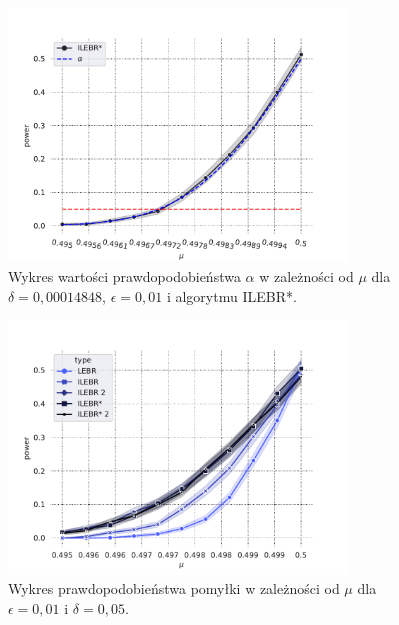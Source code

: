 \documentclass[inzynierska]{pwr_wmat_praca_dyplomowa}
\theoremstyle{plain}
\numberwithin{theorem}{chapter}
\theoremstyle{definition}
\numberwithin{theorem}{chapter}
\begin{document}
	\begin{figure}
		\centering
		\includegraphics[width=0.8\textwidth]{imagens/test_powrs_alpha_0_05.pdf}
		\caption{Wykres wartości prawdopodobieństwa $\alpha$ w zależności od $\mu$ dla $\delta =0,00014848$, $\epsilon =0,01$ i algorytmu ILEBR*.}
		\label{fig:test_powrs_alpha_0_05}
	\end{figure}
	\begin{figure}
		\centering
		\includegraphics[width=0.8\textwidth]{imagens/test_powrs.pdf}
		\caption{Wykres prawdopodobieństwa pomyłki w zależności od $\mu$ dla $\epsilon = 0,01$ i $\delta = 0,05$.}
		\label{fig:test_powrs}
	\end{figure}
\end{document}
